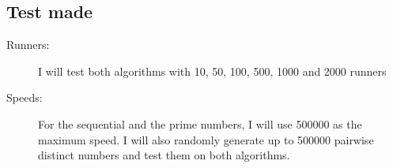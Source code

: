 \subsection{Test made} 

\begin{description}
\item[Runners:] I will test both algorithms with 10, 50, 100, 500, 1000 and 2000
runners 
\item[Speeds:] For the sequential and the prime numbers, I will use
  500000 as the maximum speed. I will also randomly generate up to
  500000 pairwise distinct numbers and test them on both algorithms.
\end{description}
